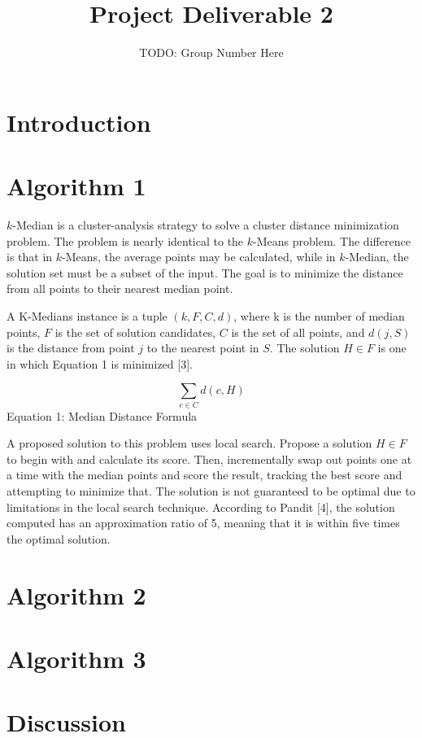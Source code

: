 \documentclass[11pt]{article}
\title{Project Deliverable 2}
\author{TODO: Group Number Here}
\begin{document}
\maketitle

\section{Introduction}

\section{Algorithm 1}

$k$-Median is a cluster-analysis strategy to solve a cluster distance minimization problem. The problem is nearly identical to the $k$-Means problem. The difference is that in $k$-Means, the average points may be calculated, while in $k$-Median, the solution set must be a subset of the input. The goal is to minimize the distance from all points to their nearest median point.

A K-Medians instance is a tuple $(k,F,C,d)$, where k is the number of median points, $F$ is the set of solution candidates, $C$ is the set of all points, and $d(j,S)$ is the distance from point $j$ to the nearest point in $S$. The solution $H \in F$ is one in which Equation 1 is minimized [3].

$$\sum_{c \in C} d(c,H)$$
Equation 1: Median Distance Formula

A proposed solution to this problem uses local search. Propose a solution $H \in F$ to begin with and calculate its score. Then, incrementally swap out points one at a time with the median points and score the result, tracking the best score and attempting to minimize that. The solution is not guaranteed to be optimal due to limitations in the local search technique. According to Pandit [4], the solution computed has an approximation ratio of 5, meaning that it is within five times the optimal solution.

\section{Algorithm 2}



\section{Algorithm 3}

\section{Discussion}
\end{document}
